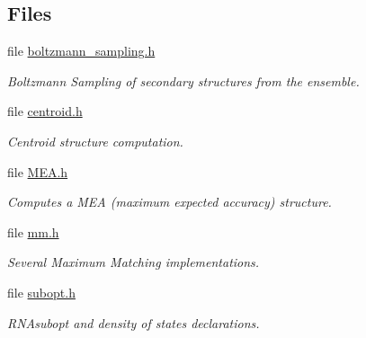\subsection*{Files}
\begin{DoxyCompactItemize}
\item 
file \mbox{\hyperlink{boltzmann__sampling_8h}{boltzmann\+\_\+sampling.\+h}}
\begin{DoxyCompactList}\small\item\em Boltzmann Sampling of secondary structures from the ensemble. \end{DoxyCompactList}\item 
file \mbox{\hyperlink{centroid_8h}{centroid.\+h}}
\begin{DoxyCompactList}\small\item\em Centroid structure computation. \end{DoxyCompactList}\item 
file \mbox{\hyperlink{_m_e_a_8h}{M\+E\+A.\+h}}
\begin{DoxyCompactList}\small\item\em Computes a M\+EA (maximum expected accuracy) structure. \end{DoxyCompactList}\item 
file \mbox{\hyperlink{mm_8h}{mm.\+h}}
\begin{DoxyCompactList}\small\item\em Several Maximum Matching implementations. \end{DoxyCompactList}\item 
file \mbox{\hyperlink{subopt_8h}{subopt.\+h}}
\begin{DoxyCompactList}\small\item\em R\+N\+Asubopt and density of states declarations. \end{DoxyCompactList}\end{DoxyCompactItemize}
